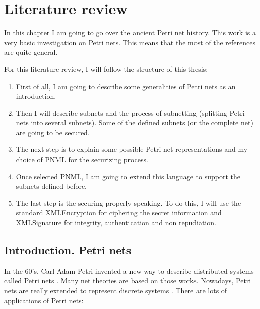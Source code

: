 
\chapter{Literature review} %

\label{Chapter: LiteratureReview} %



In this chapter I am going to go over the ancient Petri net history. 
This work is a very basic investigation 
on Petri nets. This means that the most of the references are quite general.

For this literature review, I will follow the structure of this thesis:

\begin{enumerate}
\item First of all, I am going to describe some generalities of Petri nets
as an introduction.
\item Then I will describe subnets and the process of subnetting (splitting Petri nets
into several subnets). Some of the defined subnets (or the complete net) are going to be secured. 
\item The next step is to explain some possible Petri net representations
and my choice of PNML for the securizing process.
\item Once selected PNML, I am going to extend this language to support the
subnets defined before.
\item The last step is the securing properly speaking. To do this, I will use the standard XMLEncryption for ciphering the secret information and XMLSignature
for integrity, authentication and non repudiation. \end{enumerate}

\section{Introduction. Petri nets}

In the 60's, Carl Adam Petri invented a new way to describe distributed systems
called Petri nets \citep{G-Petri1962PhD,G-Petri1966,G-Petri1976}. Many net
theories
are based on those works\cite{G-Petri2007}. Nowadays,
Petri nets are really extended to represent discrete systems \cite{G-EPN-Jimenez20044897,SM-Holloway1997151,EPN-SM-Latorre2010152,EPN-SM-Latorre2010247,EPN-SM-Silva2011427}. There are lots of applications
of Petri nets:

